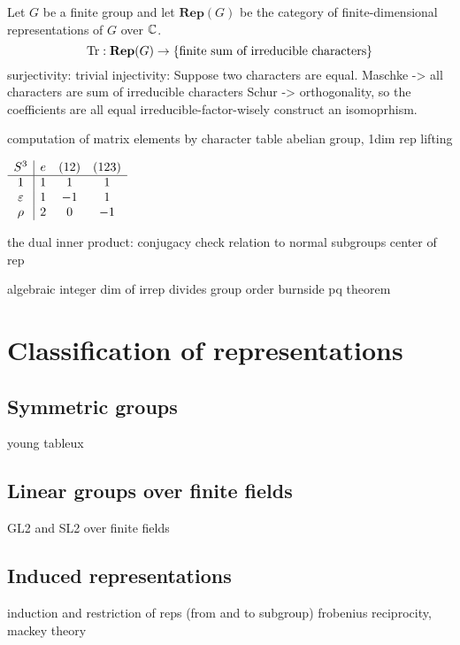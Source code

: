 \documentclass{../note}
\begin{document}
\begin{prb}
Let $G$ be a finite group and let $\mathbf{Rep}(G)$ be the category of finite-dimensional representations of $G$ over $\mathbb{C}$.
\[\operatorname{Tr}:\mathbf{Rep}(G)\to\{\text{finite sum of irreducible characters}\}\]
surjectivity: trivial
injectivity:
	Suppose two characters are equal.
	Maschke -> all characters are sum of irreducible characters
	Schur -> orthogonality, so the coefficients are all equal
	irreducible-factor-wisely construct an isomoprhism.
\end{prb}



\begin{prb}
computation of matrix elements by character table
abelian group, 1dim rep lifting
\begin{center}
$\begin{array}{c|ccc}
S^3&e&(12)&(123)\\\hline
1&1&1&1\\
\varepsilon&1&-1&1\\
\rho&2&0&-1
\end{array}$
\end{center}
\end{prb}






the dual inner product: conjugacy check
relation to normal subgroups
center of rep




algebraic integer
dim of irrep divides group order
burnside pq theorem





\chapter{Classification of representations}
\section{Symmetric groups}
young tableux

\section{Linear groups over finite fields}
GL2 and SL2 over finite fields

\section{Induced representations}
induction and restriction of reps (from and to subgroup)
frobenius reciprocity, mackey theory
\end{document}
